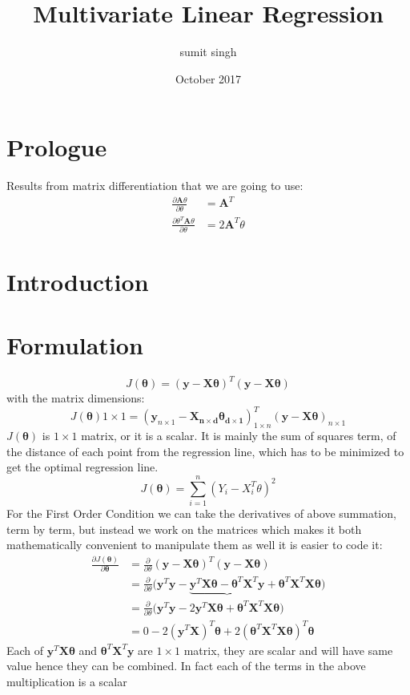 \documentclass[12pt,a4paper]{report}
\title{Multivariate Linear Regression}
\author{sumit singh}
\date{October 2017}
\begin{document}
\maketitle
\section{Prologue}
Results from matrix differentiation that we are going to use:
\begin{align}
\frac{\partial   \bm{A} \theta}{\partial \theta} &= \bm{A}^T \\
\frac{\partial \theta^T \bm{A} \theta}{\partial \theta} &= 2 \bm{A}^T \theta
\end{align}
\section{Introduction}
\section{Formulation}
\begin{equation}
J(\bm{\theta}) = (\bm{y} - \bm{X \theta})^T (\bm{y} - \bm{X \theta})
\end{equation}
with the matrix dimensions:
\begin{equation}
J(\bm{\theta}){1 \times 1} = (\bm{y}_{n \times 1} - \bm{X_{n \times d} \theta_{d \times 1}})_{1 \times n}^T (\bm{y} - \bm{X \theta})_{n \times 1}
\end{equation}
$J(\bm{\theta})$ is ${1 \times 1}$ matrix, or it is a scalar. It is mainly the sum of squares term, of the distance of each point from the regression line, which has to be minimized to get the optimal regression line. \\
\begin{equation}
J(\bm{\theta}) = \sum_{i=1}^n (Y_i - X_i^T \theta)^2
\end{equation}
For the First Order Condition we can take the derivatives of above summation, term by term, but instead we work on the matrices which makes it both mathematically convenient to manipulate them as well it is easier to code it:
\begin{align}
\frac{\partial J(\bm{\theta}) }{\partial \bm{\theta}}  &= \frac{\partial}{\partial \theta} (\bm{y} - \bm{X \theta})^T (\bm{y} - \bm{X \theta}) \\
&= \frac{\partial}{\partial \theta} \bigl(
\bm{y}^T \bm{y} -
\underbrace{
 \bm{y}^T \bm{X \theta} 
- \bm{ \theta}^T \bm{X}^T \bm{y} 
}
+ \bm{ \theta}^T \bm{X}^T \bm{X \theta} 
\bigr) \\
&= \frac{\partial}{\partial \theta} \bigl(
\bm{y}^T \bm{y} - 2
 \bm{y}^T \bm{X \theta} 
+ \bm{ \theta}^T \bm{X}^T \bm{X \theta} 
\bigr) \\
&= 0
- 2 (\bm{y}^T \bm{X})^T \bm{\theta}
+ 2 (\bm{ \theta}^T \bm{X}^T \bm{X \theta} )^T \bm{\theta} 
\end{align}
Each of $\bm{y}^T \bm{X \theta}$ and $\bm{ \theta}^T \bm{X}^T \bm{y}$  are $1 \times 1$ matrix, they are scalar and will have same value hence they can be combined. In fact each of the terms in the above multiplication is a scalar\\ 
\end{document}
